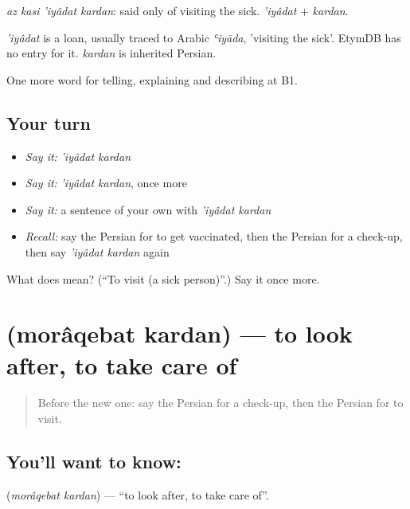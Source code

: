 \emph{az kasi 'iyâdat kardan}: said only of visiting the sick. \emph{'iyâdat} + \emph{kardan}.

\begin{cousinweb}
\emph{'iyâdat} is a loan, usually traced to Arabic \emph{ʿiyāda}, 'visiting the sick'. EtymDB has no entry for it. \emph{kardan} is inherited Persian.
\end{cousinweb}

\begin{grammarlens}[title={What you've built}]
One more word for telling, explaining and describing at B1.
\end{grammarlens}

\subsection*{Your turn}
\begin{itemize}
\raggedright
  \item \emph{Say it:} \emph{'iyâdat kardan}
  \item \emph{Say it:} \emph{'iyâdat kardan}, once more
  \item \emph{Say it:} a sentence of your own with \emph{'iyâdat kardan}
  \item \emph{Recall:} say the Persian for to get vaccinated, then the Persian for a check-up, then say \emph{'iyâdat kardan} again
\end{itemize}

\begin{tcolorbox}[breakable,colback=teal!4,colframe=teal!35!black,title={Before you move on}]
What does   mean? (\textquotedblleft{}To visit (a sick person)\textquotedblright{}.) Say it once more.
\end{tcolorbox}
\section[\texorpdfstring{\fa{مراقبت} \fa{کردن} (morâqebat kardan)}{مراقبت کردن (morâqebat kardan)}]{  (morâqebat kardan) — to look after, to take care of}

\label{lesson:FA-C494-moraqebat-kardan}



\begin{quote}
Before the new one: say the Persian for a check-up, then the Persian for to visit.
\end{quote}

\subsection*{You'll want to know:  }
\textbf{ } (\emph{morâqebat kardan}) — \textquotedblleft{}to look after, to take care of\textquotedblright{}.

